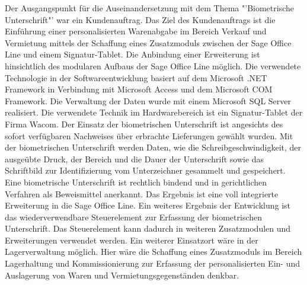 Der Ausgangspunkt für die Auseinandersetzung mit dem Thema "'Biometrische Unterschrift"' war ein Kundenauftrag. Das Ziel des Kundenauftrags ist die Einführung einer personalisierten Warenabgabe im Bereich Verkauf und Vermietung mittels der Schaffung eines Zusatzmoduls zwischen der Sage Office Line und einem Signatur-Tablet.
\newline
Die Anbindung einer Erweiterung ist hinsichtlich des modularen Aufbaus der Sage Office Line möglich. Die verwendete Technologie in der Softwareentwicklung basiert auf dem Microsoft .NET Framework in Verbindung mit Microsoft Access und dem Microsoft COM Framework. Die Verwaltung der Daten wurde mit einem Microsoft SQL Server realisiert. Die verwendete Technik im Hardwarebereich ist ein Signatur-Tablet der Firma Wacom. Der Einsatz der biometrischen Unterschrift ist angesichts des sofort verfügbaren Nachweises über erbrachte Lieferungen gewählt wurden. Mit der biometrischen Unterschrift werden Daten, wie die Schreibgeschwindigkeit, der ausgeübte Druck, der Bereich und die Dauer der Unterschrift sowie das Schriftbild zur Identifizierung vom Unterzeichner gesammelt und gespeichert. Eine biometrische Unterschrift ist rechtlich bindend und in gerichtlichen Verfahren als Beweismittel anerkannt. 
\newline
Das Ergebnis ist eine voll integrierte Erweiterung in die Sage Office Line. Ein weiteres Ergebnis der Entwicklung ist das wiederverwendbare Steuerelement zur Erfassung der biometrischen Unterschrift. Das Steuerelement kann dadurch in weiteren Zusatzmodulen und Erweiterungen verwendet werden. Ein weiterer Einsatzort wäre in der Lagerverwaltung möglich. Hier wäre die Schaffung eines Zusatzmoduls im Bereich Lagerhaltung und Kommissionierung zur Erfassung der personalisierten Ein- und Auslagerung von Waren und Vermietungsgegenständen denkbar.